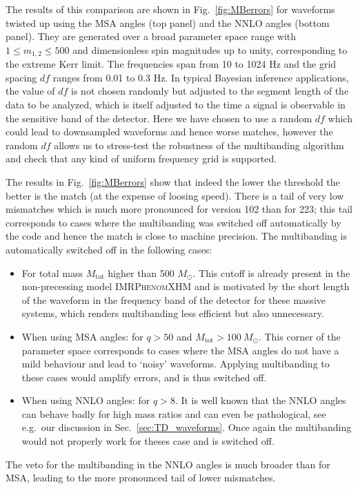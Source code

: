 \documentclass[%
aps,
prd,
amssymb,
amsmath,
amsfonts,
eqsecnum,
showpacs,
nofootinbib,
floatfix,
twocolumn,
twoside,
a4paper,
superscriptaddress
]{revtex4-1}
\newcommand{\phXHM}{\textsc{IMRPhenomXHM}\xspace}
\newcommand{\phXPHM}{\textsc{IMRPhenomXPHM}\xspace}
\begin{document}
The results of this comparison are shown in Fig.~\ref{fig:MBerrors} for waveforms twisted up using the MSA angles (top panel) and the NNLO angles (bottom panel). 
They are generated over a broad parameter space  range with $1 \leq m_{1,2} \leq 500$ and dimensionless spin magnitudes up to unity, corresponding to the extreme Kerr limit. The frequencies span from 10 to 1024 Hz and the grid spacing $df$ ranges from 0.01 to 0.3 Hz. In typical Bayesian inference applications, the value of $df$ is not chosen randomly but adjusted to the segment length of the data to be analyzed, which is itself adjusted to the time a signal is observable in the sensitive band of the detector. Here we have chosen to use a random $df$ which could lead to downsampled waveforms and hence worse matches, however the random $df$ allows us to stress-test the robustness of the multibanding algorithm and check that any kind of uniform frequency grid is supported. 

The results in Fig.~\ref{fig:MBerrors} show that indeed the lower the threshold the better is the match (at the expense of loosing speed). There is a tail of very low mismatches which is much more pronounced for version 102 than for 223; this tail corresponds to cases where the multibanding was switched off automatically by the code and hence the match is close to machine precision. The multibanding is automatically switched off in the following cases:
\begin{itemize}
    \item For total mass $M_{\mathrm{tot}}$ higher than 500 $M_{\odot}$. This cutoff is already present in the non-precessing model \phXHM and is motivated by the short length of the waveform in the frequency band of the detector for these massive systems, which renders multibanding less efficient but also unnecessary.
    \item When using MSA angles: for $q > 50$ and $M_{\mathrm{tot}} > 100 \:M_{\odot}$. This corner of the parameter space corresponds to cases where the MSA angles do not have a mild behaviour and lead to `noisy' waveforms. Applying multibanding to these cases would amplify errors, and is thus switched off.
    \item When using NNLO angles: for $q > 8$. It is well known that the NNLO angles can behave badly for high mass ratios and can even be pathological, see e.g.~our discussion in Sec.~\ref{sec:TD_waveforms}. Once again the multibanding would not properly work for theses case and is switched off. 
\end{itemize}
The veto for the multibanding in the NNLO angles is much broader than for MSA, leading to the more pronounced tail of lower mismatches.
\end{document}
